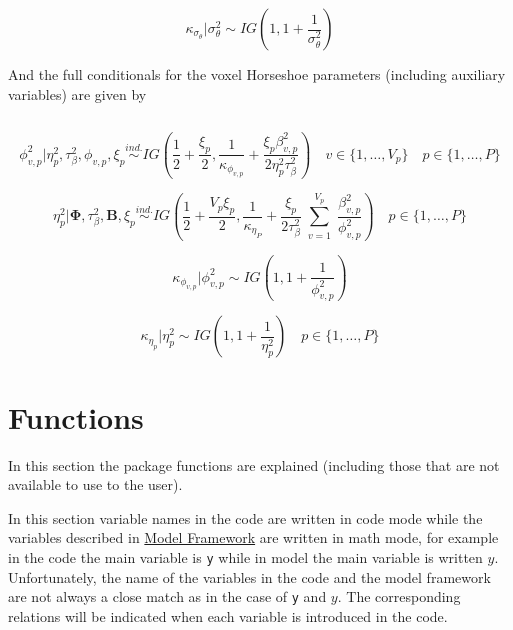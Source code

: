 \documentclass[
]{article}
\begin{document}
\begin{equation}
\kappa_{\sigma_\theta}|\sigma^2_\theta \sim IG \left(1, 1 + \frac{1}{\sigma^2_\theta}\right)
\label{eq:horseshoeKappaSigma}
\end{equation}

And the full conditionals for the voxel Horseshoe parameters (including auxiliary variables) are given by

\begin{equation}
\label{eq:horseshoePhi}
\end{equation}

\begin{equation}
\phi^2_{v,p}| \eta^2_p, \tau^2_\beta, \phi_{v,p}, \xi_p \stackrel{ind.}{\sim} IG \left(\frac{1}{2}+\frac{\xi_p}{2}, \frac{1}{\kappa_{\phi_{v,p}}}+\frac{ \xi_p \beta^2_{v,p}}{2 \eta^2_p \tau^2_\beta}\right) \quad v \in \{1,\ldots,V_p\} \quad p \in \{1,\ldots,P\}
\label{eq:horseshoePhi}
\end{equation}

\begin{equation}
\eta^2_p|  {\boldsymbol \Phi} , \tau^2_\beta,  {\boldsymbol B} , \xi_p \stackrel{ind.}{\sim} IG \left(\frac{1}{2} + \frac{V_p \xi_p}{2}, \frac{1}{\kappa_{\eta_P}} + \frac{\xi_p}{2 \tau^2_\beta} \sum_{\substack{v=1}}^{V_p}\frac{\beta_{v,p}^2}{\phi^2_{v,p}} \right) \quad p \in \{1,\ldots,P\}
\label{eq:horseshoeEta}
\end{equation}

\begin{equation}
\kappa_{\phi_{v,p}}|\phi^2_{v,p} \sim IG \left(1, 1 + \frac{1}{\phi^2_{v,p}}\right)
\label{eq:horseshoeKappaPhi}
\end{equation}

\begin{equation}
\kappa_{\eta_p}|\eta^2_p \sim IG \left(1, 1 + \frac{1}{\eta^2_p}\right) \quad p \in \{1,\ldots,P\}
\label{eq:horseshoeKappaEta}
\end{equation}

\section{Functions}\label{functions}

In this section the package functions are explained (including those that are
not available to use to the user).

In this section variable names in the code are written in code mode while the
variables described in \hyperref[modelFramework]{Model Framework} are written in math mode, for example
in the code the main variable is \texttt{y} while in model the main
variable is written \(y\). Unfortunately, the name of the variables in the code
and the model framework are not always a close match as in the case of \texttt{y} and
\(y\). The corresponding relations will be indicated when each variable is
introduced in the code.
\end{document}
